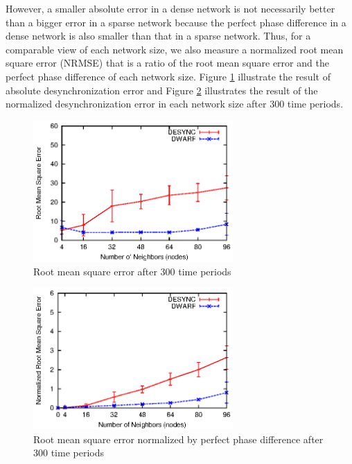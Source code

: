 However, a smaller absolute error in a dense network is not necessarily better than a bigger error in a sparse network because the perfect phase difference in a dense network is also smaller than that in a sparse network.
Thus, for a comparable view of each network size, we also measure a normalized root mean square error (NRMSE) that is a ratio of the root mean square error and the perfect phase difference of each network size.
Figure  \ref{fig:rmse300rounds} illustrate the result of absolute desynchronization error and Figure \ref{fig:nrmse300rounds} illustrates the result of the normalized desynchronization error in each network size after 300 time periods.

\begin{figure}[!t]
\centering
\includegraphics[width=3.0in]{figure/compare300rounds_rmse_sd}
\caption{Root mean square error after 300 time periods}
\label{fig:rmse300rounds}
\end{figure}

\begin{figure}[!t]
\centering
\includegraphics[width=3.0in]{figure/compare300rounds_nrmse-expected_sd}
\caption{Root mean square error normalized by perfect phase difference after 300 time periods}
\label{fig:nrmse300rounds}
\end{figure}

